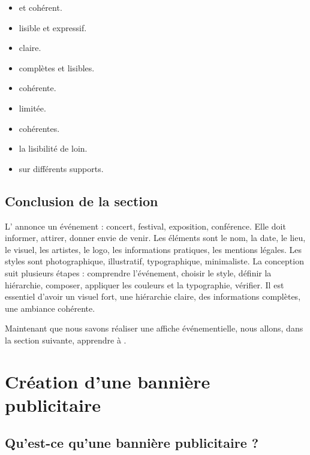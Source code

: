 \begin{itemize}
    \item {} et cohérent.
    \item {} lisible et expressif.
    \item {} claire.
    \item {} complètes et lisibles.
    \item {} cohérente.
    \item {} limitée.
    \item {} cohérentes.
    \item {} la lisibilité de loin.
    \item {} sur différents supports.
\end{itemize}

\subsection*{Conclusion de la section}

L' annonce un événement : concert, festival, exposition, conférence. Elle doit informer, attirer, donner envie de venir. Les éléments sont le nom, la date, le lieu, le visuel, les artistes, le logo, les informations pratiques, les mentions légales. Les styles sont photographique, illustratif, typographique, minimaliste. La conception suit plusieurs étapes : comprendre l'événement, choisir le style, définir la hiérarchie, composer, appliquer les couleurs et la typographie, vérifier. Il est essentiel d'avoir un visuel fort, une hiérarchie claire, des informations complètes, une ambiance cohérente.

Maintenant que nous savons réaliser une affiche événementielle, nous allons, dans la section suivante, apprendre à .

\section{Création d'une bannière publicitaire}

\subsection{Qu'est-ce qu'une bannière publicitaire ?}

